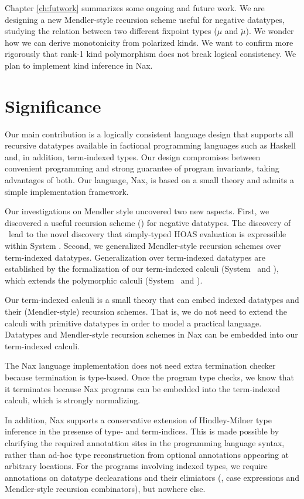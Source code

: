 Chapter \ref{ch:futwork} summarizes some ongoing and future work.
We are designing a new Mendler-style recursion scheme useful
for negative datatypes, studying the relation between two different
fixpoint types ($\mu$ and $\breve\mu$). We wonder how we can derive
monotonicity from polarized kinds. We want to confirm more rigorously
that rank-1 kind polymorphism does not break logical consistency.
We plan to implement kind inference in Nax.

\section{Significance}\label{sec:concl:sig}
Our main contribution is a logically consistent language design that supports
all recursive datatypes available in factional programming languages such as
Haskell and, in addition, term-indexed types. Our design compromises between
convenient programming and strong guarantee of program invariants, taking
advantages of both. Our language, Nax, is based on a small theory and
admits a simple implementation framework.

Our investigations on Mendler style uncovered two new aspects.
First, we discovered a useful recursion scheme (\MsfIt) for negative datatypes.
The discovery of \MsfIt\ lead to the novel discovery that simply-typed HOAS
evaluation is expressible within System \Fw. Second, we generalized
Mendler-style recursion schemes over term-indexed datatypes.
Generalization over term-indexed datatypes are established by
the formalization of our term-indexed calculi (System \Fi\ and \Fixi),
which extends the polymorphic calculi (System \Fw\ and \Fixw).

Our term-indexed calculi is a small theory that can embed indexed datatypes
and their (Mendler-style) recursion schemes. That is, we do not need to extend
the calculi with primitive datatypes in order to model a practical language.
Datatypes and Mendler-style recursion schemes in Nax can be embedded into
our term-indexed calculi.

The Nax language implementation does not need extra termination checker
because termination is type-based. Once the program type checks, we know
that it terminates because Nax programs can be embedded into
the term-indexed calculi, which is strongly normalizing.

In addition, Nax supports a conservative extension of Hindley-Milner
type inference in the presense of type- and term-indices.
This is made possible by clarifying the required annotattion sites
in the programming language syntax, rather than ad-hoc type reconstruction
from optional annotations appearing at arbitrary locations.
For the programs involving indexed types, we require annotations
on datatype declearations and their elimiators
(\ie, case expressions and Mendler-style recursion combinators),
but nowhere else.

